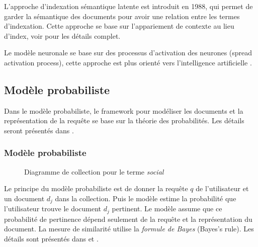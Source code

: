 L'approche d'indexation sémantique latente est introduit en 1988, qui permet de garder la sémantique des documents pour avoir une relation entre les termes d'indexation. Cette approche se base sur l’appariement de contexte au lieu d'index, voir  \citep{modern-ir} pour les détails complet.

Le modèle neuronale se base sur des processus d'activation des neurones (spread activation process), cette approche est plus orienté vers l’intelligence artificielle \citep*{modern-ir}.

\subsection{Modèle probabiliste}
Dans le modèle probabiliste, le framework pour modéliser les documents et la représentation de la requête se base sur la théorie des probabilités. Les détails seront présentés dans  \citep{modern-ir}.

\subsubsection{Modèle probabiliste}
\begin{figure}[htbp]
    \begin{center}
    \end{center}
    \caption{Diagramme de collection pour le terme \emph{social} \citep{model-ir}}\label{fig:probabilistic-model}
\end{figure}

Le principe du modèle probabiliste est de donner la requête $q$ de l'utilisateur et un document $d_{j}$ dans la collection. Puis le modèle estime la probabilité que l'utilisateur trouve le document $d_{j}$ pertinent. Le modèle assume que ce probabilité de pertinence dépend seulement de la requête et la représentation du document. La mesure de similarité utilise la \emph{formule de Bayes} (Bayes's rule). Les détails sont présentés dans  \citep{model-ir} et  \citep{modern-ir}.


